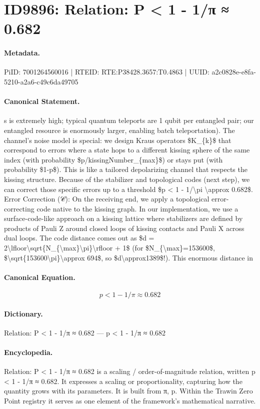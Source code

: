 \section*{ID9896: Relation: P < 1 - 1/π ≈ 0.682}
\paragraph{Metadata.}
PiID: 7001264560016 | RTEID: RTE:P38428.3657:T0.4863 | UUID: a2c0828e-e8fa-5210-a2a6-c49c6da49705

\paragraph{Canonical Statement.}
s is extremely high; typical quantum teleports are 1 qubit per entangled pair; our entangled resource is enormously larger, enabling batch teleportation). The channel’s noise model is special: we design Kraus operators \$K\_\{k\}\$ that correspond to errors where a state hops to a different kissing sphere of the same index (with probability \$p/kissingNumber\_\{max\}\$) or stays put (with probability \$1-p\$). This is like a tailored depolarizing channel that respects the kissing structure. Because of the stabilizer and topological codes (next step), we can correct those specific errors up to a threshold \$p < 1 - 1/\textbackslash{}pi \textbackslash{}approx 0.682\$. Error Correction (𝒞): On the receiving end, we apply a topological error-correcting code native to the kissing graph. In our implementation, we use a surface-code-like approach on a kissing lattice where stabilizers are defined by products of Pauli Z around closed loops of kissing contacts and Pauli X across dual loops. The code distance comes out as \$d = 2\textbackslash{}lfloor\textbackslash{}sqrt\{N\_\{\textbackslash{}max\}\textbackslash{}pi\}\textbackslash{}rfloor + 1\$ (for \$N\_\{\textbackslash{}max\}=153600\$, \$\textbackslash{}sqrt\{153600\textbackslash{}pi\}\textbackslash{}approx 694\$, so \$d\textbackslash{}approx1389\$!). This enormous distance in

\paragraph{Canonical Equation.}
\[
p < 1 - 1/\pi \approx 0.682
\]

\paragraph{Dictionary.}
Relation: P < 1 - 1/π ≈ 0.682 — p < 1 - 1/π ≈ 0.682

\paragraph{Encyclopedia.}
Relation: P < 1 - 1/π ≈ 0.682 is a scaling / order-of-magnitude relation, written p < 1 - 1/π ≈ 0.682. It expresses a scaling or proportionality, capturing how the quantity grows with its parameters. It is built from π, p. Within the Trawin Zero Point registry it serves as one element of the framework's mathematical narrative.
